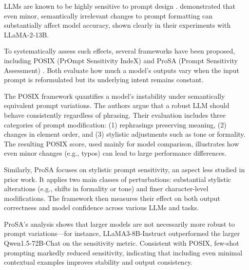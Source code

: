LLMs are known to be highly sensitive to prompt design \citep{sclar2023quantifying, gao2020making, jiang2020can}. 
\citet{sclar2023quantifying} demonstrated that even minor, semantically irrelevant changes to prompt formatting can substantially affect model accuracy, shown clearly in their experiments with LLaMA-2-13B.

To systematically assess such effects, several frameworks have been proposed, including POSIX (PrOmpt Sensitivity IndeX) \citep{chatterjee2024posix} and ProSA (Prompt Sensitivity Assessment) \citep{zhuo2024prosa}. Both evaluate how much a model’s outputs vary when the input prompt is reformulated but its underlying intent remains constant.

The POSIX framework quantifies a model’s instability under semantically equivalent prompt variations. The authors argue that a robust LLM should behave consistently regardless of phrasing. Their evaluation includes three categories of prompt modification: (1) rephrasings preserving meaning, (2) changes in element order, and (3) stylistic adjustments such as tone or formality. The resulting POSIX score, used mainly for model comparison, illustrates how even minor changes (e.g., typos) can lead to large performance differences.

Similarly, ProSA focuses on stylistic prompt sensitivity, an aspect less studied in prior work. It applies two main classes of perturbations: substantial stylistic alterations (e.g., shifts in formality or tone) and finer character-level modifications. The framework then measures their effect on both output correctness and model confidence across various LLMs and tasks. 

ProSA’s analysis shows that larger models are not necessarily more robust to prompt variations—for instance, LLaMA3-8B-Instruct outperformed the larger Qwen1.5-72B-Chat on the sensitivity metric. Consistent with POSIX, few-shot prompting markedly reduced sensitivity, indicating that including even minimal contextual examples improves stability and output consistency.
